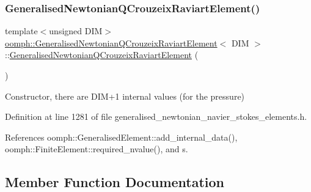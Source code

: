 \subsubsection{\texorpdfstring{Generalised\+Newtonian\+Q\+Crouzeix\+Raviart\+Element()}{GeneralisedNewtonianQCrouzeixRaviartElement()}}
{\footnotesize\ttfamily template$<$unsigned D\+IM$>$ \\
\hyperlink{classoomph_1_1GeneralisedNewtonianQCrouzeixRaviartElement}{oomph\+::\+Generalised\+Newtonian\+Q\+Crouzeix\+Raviart\+Element}$<$ D\+IM $>$\+::\hyperlink{classoomph_1_1GeneralisedNewtonianQCrouzeixRaviartElement}{Generalised\+Newtonian\+Q\+Crouzeix\+Raviart\+Element} (\begin{DoxyParamCaption}{ }\end{DoxyParamCaption})\hspace{0.3cm}{\ttfamily [inline]}}



Constructor, there are D\+I\+M+1 internal values (for the pressure) 



Definition at line 1281 of file generalised\+\_\+newtonian\+\_\+navier\+\_\+stokes\+\_\+elements.\+h.



References oomph\+::\+Generalised\+Element\+::add\+\_\+internal\+\_\+data(), oomph\+::\+Finite\+Element\+::required\+\_\+nvalue(), and s.



\subsection{Member Function Documentation}
\mbox{\label{classoomph_1_1GeneralisedNewtonianQCrouzeixRaviartElement_a6fb21f312f636058e51f9598594076f0}} 
